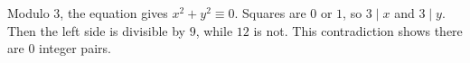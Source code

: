 Modulo $3$, the equation gives $x^2+y^2\equiv0$. Squares are $0$ or $1$, so $3\mid x$ and $3\mid y$. Then the left side is divisible by $9$, while $12$ is not. This contradiction shows there are $\boxed0$ integer pairs.
